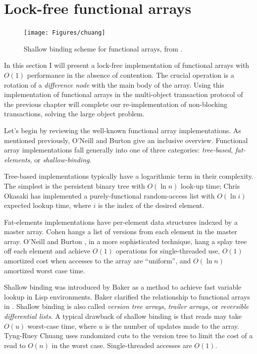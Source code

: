\section{Lock-free functional arrays}\label{sec:lf-fun-arr}
\begin{figure}\centering
\texttt{[image: Figures/chuang]}
\caption[Shallow binding scheme for functional arrays.]
  {Shallow binding scheme for functional arrays, from
  \cite[Figure~1]{Chuang94}.}
\label{fig:chuang}
\end{figure}
In this section I will present a lock-free implementation of functional
arrays with $O(1)$ performance in the absence of contention.
The crucial operation is a rotation of a \emph{difference node} with the
main body of the array. Using this implementation of functional arrays
in the multi-object transaction protocol of the previous chapter
will complete our re-implementation of non-blocking transactions,
solving the large object problem.

Let's begin by reviewing the well-known functional array
implementations.  As mentioned previously,
O'Neill and Burton \cite{ONeillBu97} give an
inclusive overview.  Functional array implementations fall generally
into one of three categories: \emph{tree-based}, \emph{fat-elements},
or \emph{shallow-binding}.

Tree-based implementations typically have a logarithmic term in their
complexity.  The simplest is the persistent binary tree with $O(\ln
n)$ look-up time; Chris Okasaki 
\cite{Okasaki95} has implemented a purely-functional random-access list
with $O(\ln i)$ expected lookup time, where $i$ is the index of the
desired element.

Fat-elements implementations have per-element data structures indexed
by a master array. Cohen \cite{Cohen84} hangs a list of
versions from each element in the master array.
O'Neill and Burton \cite{ONeillBu97}, in a more sophisticated
technique, hang a splay tree off each element and achieve $O(1)$
operations for single-threaded use, $O(1)$ amortized cost when
accesses to the array are ``uniform'', and $O(\ln n)$ amortized worst
case time. 

Shallow binding was introduced by Baker \cite{Baker78} as a method to
achieve fast variable lookup in Lisp environments.  Baker clarified
the relationship to functional arrays in \cite{Baker91}.  Shallow
binding is also called \emph{version tree arrays}, \emph{trailer
  arrays}, or \emph{reversible differential lists}.  A typical
drawback of shallow binding is that reads may take $O(u)$ worst-case
time, where $u$ is the number of updates made to the array.  Tyng-Ruey
Chuang \cite{Chuang94} uses randomized cuts to the version tree to limit
the cost of a read to $O(n)$ in the worst case.  Single-threaded
accesses are $O(1)$.

